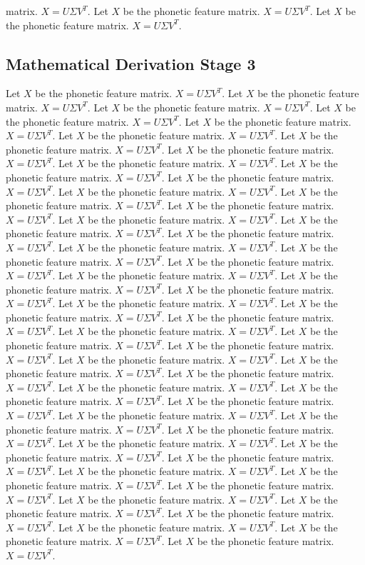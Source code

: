 matrix. $X = U\Sigma V^T$. Let $X$ be the phonetic feature matrix. $X = U\Sigma V^T$. Let $X$ be the phonetic feature matrix. $X = U\Sigma V^T$. 

\subsection{Mathematical Derivation Stage 3}
Let $X$ be the phonetic feature matrix. $X = U\Sigma V^T$. Let $X$ be the phonetic feature matrix. $X = U\Sigma V^T$. Let $X$ be the phonetic feature matrix. $X = U\Sigma V^T$. Let $X$ be the phonetic feature matrix. $X = U\Sigma V^T$. Let $X$ be the phonetic feature matrix. $X = U\Sigma V^T$. Let $X$ be the phonetic feature matrix. $X = U\Sigma V^T$. Let $X$ be the phonetic feature matrix. $X = U\Sigma V^T$. Let $X$ be the phonetic feature matrix. $X = U\Sigma V^T$. Let $X$ be the phonetic feature matrix. $X = U\Sigma V^T$. Let $X$ be the phonetic feature matrix. $X = U\Sigma V^T$. Let $X$ be the phonetic feature matrix. $X = U\Sigma V^T$. Let $X$ be the phonetic feature matrix. $X = U\Sigma V^T$. Let $X$ be the phonetic feature matrix. $X = U\Sigma V^T$. Let $X$ be the phonetic feature matrix. $X = U\Sigma V^T$. Let $X$ be the phonetic feature matrix. $X = U\Sigma V^T$. Let $X$ be the phonetic feature matrix. $X = U\Sigma V^T$. Let $X$ be the phonetic feature matrix. $X = U\Sigma V^T$. Let $X$ be the phonetic feature matrix. $X = U\Sigma V^T$. Let $X$ be the phonetic feature matrix. $X = U\Sigma V^T$. Let $X$ be the phonetic feature matrix. $X = U\Sigma V^T$. Let $X$ be the phonetic feature matrix. $X = U\Sigma V^T$. Let $X$ be the phonetic feature matrix. $X = U\Sigma V^T$. Let $X$ be the phonetic feature matrix. $X = U\Sigma V^T$. Let $X$ be the phonetic feature matrix. $X = U\Sigma V^T$. Let $X$ be the phonetic feature matrix. $X = U\Sigma V^T$. Let $X$ be the phonetic feature matrix. $X = U\Sigma V^T$. Let $X$ be the phonetic feature matrix. $X = U\Sigma V^T$. Let $X$ be the phonetic feature matrix. $X = U\Sigma V^T$. Let $X$ be the phonetic feature matrix. $X = U\Sigma V^T$. Let $X$ be the phonetic feature matrix. $X = U\Sigma V^T$. Let $X$ be the phonetic feature matrix. $X = U\Sigma V^T$. Let $X$ be the phonetic feature matrix. $X = U\Sigma V^T$. Let $X$ be the phonetic feature matrix. $X = U\Sigma V^T$. Let $X$ be the phonetic feature matrix. $X = U\Sigma V^T$. Let $X$ be the phonetic feature matrix. $X = U\Sigma V^T$. Let $X$ be the phonetic feature matrix. $X = U\Sigma V^T$. Let $X$ be the phonetic feature matrix. $X = U\Sigma V^T$. Let $X$ be the phonetic feature matrix. $X = U\Sigma V^T$. Let $X$ be the phonetic feature matrix. $X = U\Sigma V^T$. Let $X$ be the phonetic feature matrix. $X = U\Sigma V^T$. Let $X$ be the phonetic feature matrix. $X = U\Sigma V^T$. Let $X$ be the phonetic feature matrix. $X = U\Sigma V^T$. Let $X$ be the phonetic feature matrix. $X = U\Sigma V^T$. Let $X$ be the phonetic feature matrix. $X = U\Sigma V^T$. Let $X$ be the phonetic feature matrix. $X = U\Sigma V^T$. Let $X$ be the phonetic feature matrix. $X = U\Sigma V^T$. Let $X$ be the phonetic feature matrix. $X = U\Sigma V^T$. Let $X$ be the phonetic feature matrix. $X = U\Sigma V^T$. Let $X$ be the phonetic feature matrix. $X = U\Sigma V^T$. Let $X$ be the phonetic feature matrix. $X = U\Sigma V^T$. 

